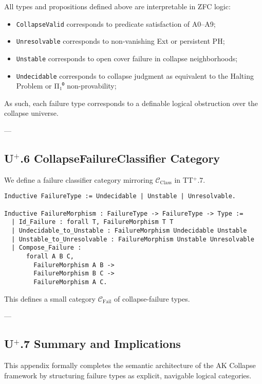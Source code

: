 \documentclass[11pt]{article}
\begin{document}
All types and propositions defined above are interpretable in ZFC logic:

\begin{itemize}
  \item \texttt{CollapseValid} corresponds to predicate satisfaction of A0–A9;
  \item \texttt{Unresolvable} corresponds to non-vanishing Ext or persistent PH;
  \item \texttt{Unstable} corresponds to open cover failure in collapse neighborhoods;
  \item \texttt{Undecidable} corresponds to collapse judgment as equivalent to the Halting Problem or Π₁⁰ non-provability;
\end{itemize}

As such, each failure type corresponds to a definable logical obstruction over the collapse universe.

---

\subsection*{U$^{+}$.6 CollapseFailureClassifier Category}

We define a failure classifier category mirroring \(\mathcal{C}_{\text{Class}}\) in TT$^{+}$.7.

\begin{lstlisting}[language=Coq]
Inductive FailureType := Undecidable | Unstable | Unresolvable.

Inductive FailureMorphism : FailureType -> FailureType -> Type :=
  | Id_Failure : forall T, FailureMorphism T T
  | Undecidable_to_Unstable : FailureMorphism Undecidable Unstable
  | Unstable_to_Unresolvable : FailureMorphism Unstable Unresolvable
  | Compose_Failure :
      forall A B C,
        FailureMorphism A B ->
        FailureMorphism B C ->
        FailureMorphism A C.
\end{lstlisting}

This defines a small category \(\mathcal{C}_{\text{Fail}}\) of collapse-failure types.

---

\subsection*{U$^{+}$.7 Summary and Implications}

This appendix formally completes the semantic architecture of the AK Collapse framework  
by structuring failure types as explicit, navigable logical categories.
\end{document}
